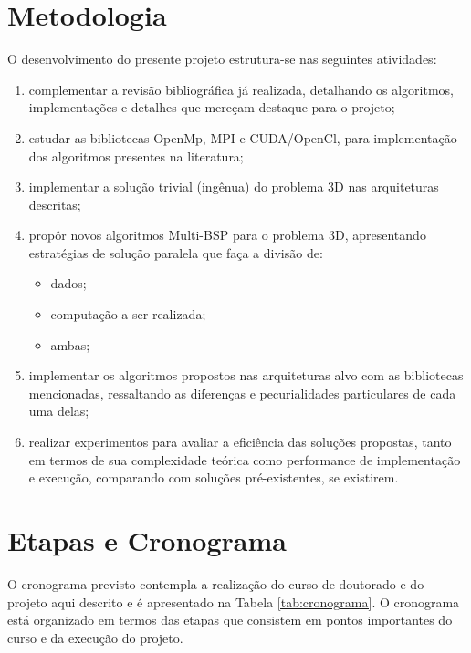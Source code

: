 \documentclass[a4paper, 12pt] {article}
\begin{document}
\section{Metodologia}

O desenvolvimento do presente projeto estrutura-se nas seguintes atividades:

\begin{enumerate}
  \item complementar a revisão bibliográfica já realizada, detalhando os
  algoritmos, implementações e detalhes que mereçam destaque para o projeto;
  \item estudar as bibliotecas OpenMp, MPI e CUDA/OpenCl, para implementação
  dos algoritmos presentes na literatura;
  \item implementar a solução trivial (ingênua) do problema 3D nas arquiteturas
  descritas;
  \item propôr novos algoritmos Multi-BSP para o problema 3D, apresentando
  estratégias de solução paralela que faça a divisão de:
  	\begin{itemize}
  	  \item dados;
  	  \item computação a ser realizada;
  	  \item ambas;
  	\end{itemize}
  \item implementar os algoritmos propostos nas arquiteturas alvo com as
  bibliotecas mencionadas, ressaltando as diferenças e pecurialidades
  particulares de cada uma delas;
  \item realizar experimentos para avaliar a eficiência das soluções propostas,
  tanto em termos de sua complexidade teórica como performance de implementação
  e execução, comparando com soluções pré-existentes, se existirem.
\end{enumerate}

\section{Etapas e Cronograma}

O cronograma previsto contempla a realização do curso de doutorado e do projeto
aqui descrito e é apresentado na Tabela \ref{tab:cronograma}. O cronograma está
organizado em termos das etapas que consistem em pontos importantes do curso e da execução do projeto.
\end{document}
